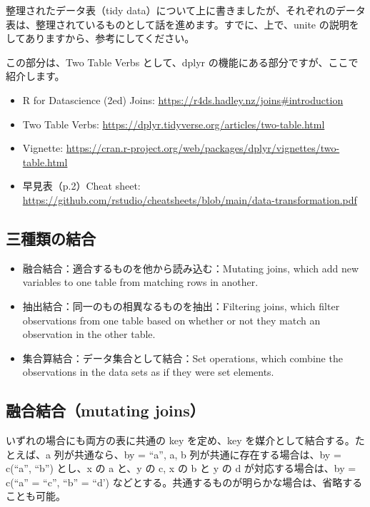 \documentclass[
  xelatex, ja=standard]{bxjsbook}
\providecommand{\tightlist}{%
  \setlength{\itemsep}{0pt}\setlength{\parskip}{0pt}}
\theoremstyle{definition}
\theoremstyle{definition}
\theoremstyle{definition}
\theoremstyle{definition}
\theoremstyle{remark}
\begin{document}
整理されたデータ表（tidy data）について上に書きましたが、それぞれのデータ表は、整理されているものとして話を進めます。すでに、上で、unite の説明をしてありますから、参考にしてください。

この部分は、Two Table Verbs として、dplyr の機能にある部分ですが、ここで紹介します。

\begin{itemize}
\tightlist
\item
  R for Datascience (2ed) Joins: \url{https://r4ds.hadley.nz/joins\#introduction}
\item
  Two Table Verbs: \url{https://dplyr.tidyverse.org/articles/two-table.html}
\item
  Vignette: \url{https://cran.r-project.org/web/packages/dplyr/vignettes/two-table.html}
\item
  早見表（p.2）Cheat sheet: \url{https://github.com/rstudio/cheatsheets/blob/main/data-transformation.pdf}
\end{itemize}

\hypertarget{ux4e09ux7a2eux985eux306eux7d50ux5408}{%
\subsection{三種類の結合}\label{ux4e09ux7a2eux985eux306eux7d50ux5408}}

\begin{itemize}
\item
  融合結合：適合するものを他から読み込む：Mutating joins, which add new variables to one table from matching rows in another.
\item
  抽出結合：同一のもの相異なるものを抽出：Filtering joins, which filter observations from one table based on whether or not they match an observation in the other table.
\item
  集合算結合：データ集合として結合：Set operations, which combine the observations in the data sets as if they were set elements.
\end{itemize}

\hypertarget{ux878dux5408ux7d50ux5408mutating-joins}{%
\subsection{融合結合（mutating joins）}\label{ux878dux5408ux7d50ux5408mutating-joins}}

いずれの場合にも両方の表に共通の key を定め、key を媒介として結合する。たとえば、a 列が共通なら、by = ``a'', a, b 列が共通に存在する場合は、by = c(``a'', ``b'') とし、x の a と、y の c, x の b と y の d が対応する場合は、by = c(``a'' = ``c'', ``b'' = ``d') などとする。共通するものが明らかな場合は、省略することも可能。
\end{document}
